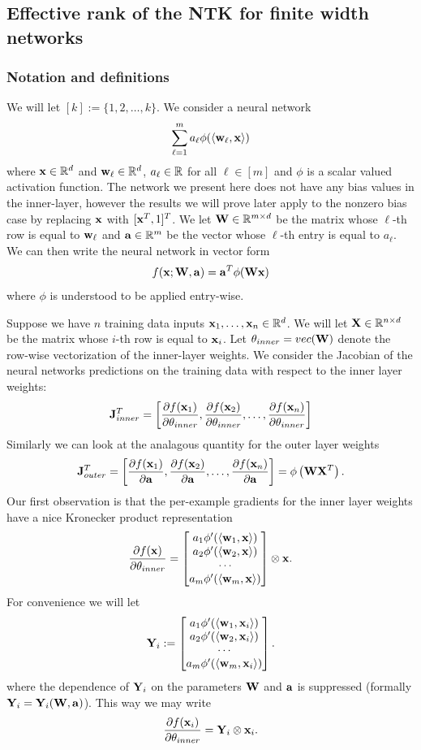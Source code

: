 \subsection{Effective rank of the NTK for finite width networks}

\subsubsection{Notation and definitions}
We will let $[k] := \{1, 2, \ldots, k\}$.  We consider a neural network
\[ \sum_{\ell = 1}^m a_\ell \phi(\langle \mathbf{w}_\ell, \mathbf{x} \rangle) \]
where $\mathbf{x} \in \mathbb{R}^d$ and $\mathbf{w}_\ell \in \mathbb{R}^d$, $a_\ell \in \mathbb{R}$ for all $\ell \in [m]$ and $\phi$ is a scalar valued activation function.  The network we present here does not have any bias values in the inner-layer, however the results we will prove later apply to the nonzero bias case by replacing $\mathbf{x}$ with $[\mathbf{x}^T, 1]^T$.  We let $\mathbf{W} \in \mathbb{R}^{m \times d}$ be the matrix whose $\ell$-th row is equal to $\mathbf{w}_\ell$ and $\mathbf{a} \in \mathbb{R}^m$ be the vector whose $\ell$-th entry is equal to $a_\ell$.  We can then write the neural network in vector form
\[ f(\mathbf{x}; \mathbf{W}, \mathbf{a}) = \mathbf{a}^T \phi(\mathbf{W} \mathbf{x}) \]
where $\phi$ is understood to be applied entry-wise.
\par
Suppose we have $n$ training data inputs $\mathbf{x}_1, \ldots, \mathbf{x}_n \in \mathbb{R}^d$.  We will let $\mathbf{X} \in \mathbb{R}^{n \times d}$ be the matrix whose $i$-th row is equal to $\mathbf{x}_i$.  Let $\mathbf{\theta}_{inner} = vec(\mathbf{W})$ denote the row-wise vectorization of the inner-layer weights.  We consider the Jacobian of the neural networks predictions on the training data with respect to the inner layer weights:
\[ \mathbf{J}_{inner}^T = \left[\frac{\partial f(\mathbf{x}_1)}{\partial \mathbf{\theta}_{inner}}, \frac{\partial f(\mathbf{x}_2)}{\partial \mathbf{\theta}_{inner}}, \ldots, \frac{\partial f(\mathbf{x}_n)}{\partial \mathbf{\theta}_{inner}}\right] \]
Similarly we can look at the analagous quantity for the outer layer weights
\[ \mathbf{J}_{outer}^T = \left[\frac{\partial f(\mathbf{x}_1)}{\partial \mathbf{a}}, \frac{\partial f(\mathbf{x}_2)}{\partial \mathbf{a}}, \ldots, \frac{\partial f(\mathbf{x}_n)}{\partial \mathbf{a}}\right] = \phi\left(\mathbf{W} \mathbf{X}^T\right). \]
Our first observation is that the per-example gradients for the inner layer weights have a nice Kronecker product representation
\[ \frac{\partial f(\mathbf{x})}{\partial \mathbf{\theta}_{inner}} = 
\begin{bmatrix}
a_1 \phi'(\langle \mathbf{w}_1, \mathbf{x} \rangle) \\
a_2 \phi'(\langle \mathbf{w}_2, \mathbf{x} \rangle) \\
\cdots \\
a_m \phi'(\langle \mathbf{w}_m, \mathbf{x} \rangle)
\end{bmatrix} \otimes \mathbf{x}. \]
For convenience we will let
\[ \mathbf{Y}_i := \begin{bmatrix}
a_1 \phi'(\langle \mathbf{w}_1, \mathbf{x}_i \rangle) \\
a_2 \phi'(\langle \mathbf{w}_2, \mathbf{x}_i \rangle) \\
\cdots \\
a_m \phi'(\langle \mathbf{w}_m, \mathbf{x}_i \rangle)
\end{bmatrix}. \]
where the dependence of $\mathbf{Y}_i$ on the parameters $\mathbf{W}$ and $\mathbf{a}$ is suppressed (formally $\mathbf{Y}_i = \mathbf{Y}_i(\mathbf{W}, \mathbf{a})$).  This way we may write
\[ \frac{\partial f(\mathbf{x}_i)}{\partial \mathbf{\theta}_{inner}} = \mathbf{Y}_i \otimes \mathbf{x}_i. \]

